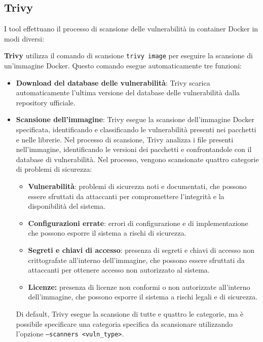 \subsection{Trivy}
I tool effettuano il processo di scansione delle vulnerabilità in container Docker in modi diversi:

\textbf{Trivy} utilizza il comando di scansione \texttt{trivy image} per eseguire la scansione di un'immagine Docker. Questo comando esegue automaticamente tre funzioni:
\begin{itemize}
   \item \textbf{Download del database delle vulnerabilità}: Trivy scarica automaticamente l'ultima versione del database delle vulnerabilità dalla repository ufficiale.
   \item \textbf{Scansione dell'immagine}: Trivy esegue la scansione dell'immagine Docker specificata, identificando e classificando le vulnerabilità presenti nei pacchetti e nelle librerie. Nel processo di scansione, Trivy analizza i file presenti nell'immagine, identificando le versioni dei pacchetti e confrontandole con il database di vulnerabilità. Nel processo, vengono scansionate quattro categorie di problemi di sicurezza:
         \begin{itemize}
            \item \textbf{Vulnerabilità}: problemi di sicurezza noti e documentati, che possono essere sfruttati da attaccanti per compromettere l'integrità e la disponibilità del sistema.
            \item \textbf{Configurazioni errate}: errori di configurazione e di implementazione che possono esporre il sistema a rischi di sicurezza.
            \item \textbf{Segreti e chiavi di accesso}: presenza di segreti e chiavi di accesso non crittografate all'interno dell'immagine, che possono essere sfruttati da attaccanti per ottenere accesso non autorizzato al sistema.
            \item \textbf{Licenze:} presenza di licenze non conformi o non autorizzate all'interno dell'immagine, che possono esporre il sistema a rischi legali e di sicurezza.
         \end{itemize}
         Di default, Trivy esegue la scansione di tutte e quattro le categorie, ma è possibile specificare una categoria specifica da scansionare utilizzando l'opzione \texttt{--scanners <vuln\_type>}.


\end{itemize}
